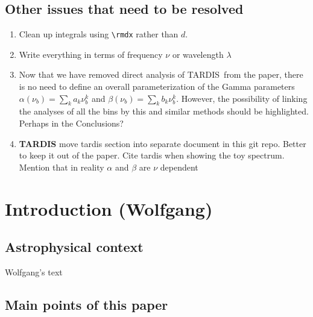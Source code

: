 \documentclass[11pt]{article}
\newcommand{\rmdx}[1]{\dd{#1}} %
\newcommand{\tardis}{TARDIS}
\begin{document}
\subsection{Other issues that need to be resolved}

\begin{enumerate}

\item Clean up integrals using \verb=\rmdx= rather than $d$.

\item Write everything in terms of frequency $\nu$ or wavelength
  $\lambda$

\item Now that we have removed direct analysis of \tardis\ from the
  paper, there is no need to define an overall parameterization of the
  Gamma parameters $\alpha(\nu_b) = \sum_k a_k \nu_b^k$ and
  $\beta(\nu_b) = \sum_k b_k \nu_b^k$. However, the possibility of
  linking the analyses of all the bins by this and similar methods
  should be highlighted. Perhaps in the Conclusions?

\item \textbf{\tardis} move tardis section into separate document in
  this git repo. Better to keep it out of the paper. Cite tardis when
  showing the toy spectrum. Mention that in reality $\alpha$ and
  $\beta$ are $\nu$ dependent

\end{enumerate}


\section{Introduction (Wolfgang)}

\subsection{Astrophysical context}

Wolfgang's text

\subsection*{Main points of this paper}
\end{document}
